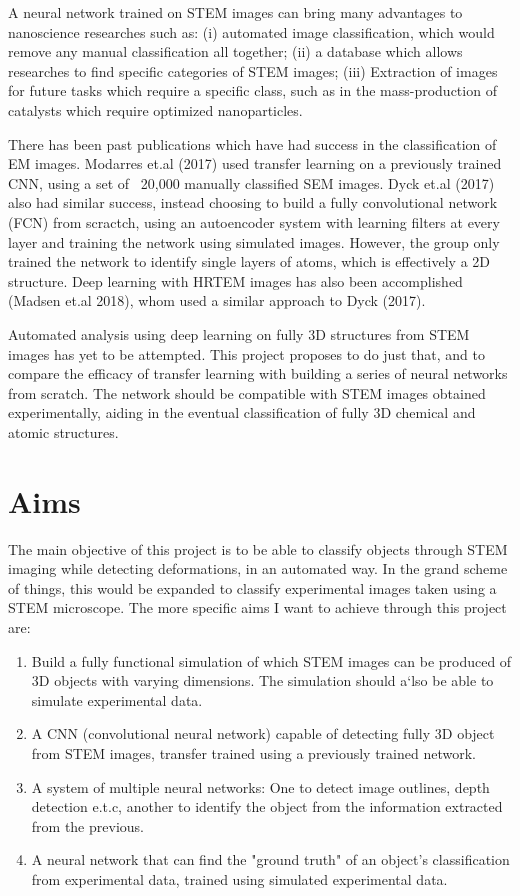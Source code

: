 \documentclass{cookedoc}
\begin{document}
	A neural network trained on STEM images can bring many advantages to nanoscience researches such as: (i) automated image classification, which would remove any manual classification all together; (ii) a database which allows researches to find specific categories of STEM images; (iii) Extraction of images for future tasks which require a specific class, such as in the mass-production of catalysts which require optimized nanoparticles. 
	
	There has been past publications which have had success in the classification of EM images. Modarres et.al (2017) used transfer learning on a previously trained 
	CNN, using a set of ~20,000 manually classified SEM images. Dyck et.al (2017) also had similar success, instead choosing to build a fully convolutional network (FCN) from scractch, using an autoencoder system with learning filters at every layer and training the network using simulated images. However, the group only trained the network to identify single layers of atoms, which is effectively a 2D structure. Deep learning with HRTEM images has also been accomplished (Madsen et.al 2018), whom used a similar approach to Dyck (2017). 
	
	Automated analysis using deep learning on fully 3D structures from STEM images has yet to be attempted. This project proposes to do just that, and to compare the efficacy of transfer learning with building a series of neural networks from scratch. The network should be compatible with STEM images obtained experimentally, aiding in the eventual classification of fully 3D chemical and atomic structures. 
	
	\section{Aims}
	
	The main objective of this project is to be able to classify objects through STEM imaging while detecting deformations, in an automated way. In the grand scheme of things, this would be expanded to classify experimental images taken using a STEM microscope. The more specific aims I want to achieve through this project are:
	
	\begin{enumerate}
		\item   Build a fully functional simulation of which STEM images can be produced of 3D objects with varying dimensions. The simulation should a`lso be able to simulate experimental data.
		\item   A CNN (convolutional neural network) capable of detecting fully 3D object from STEM images, transfer trained using a previously trained network.
		\item   A system of multiple neural networks: One to detect image outlines, depth detection e.t.c, another to identify the object from the information extracted from the previous.
		\item   A neural network that can find the "ground truth" of an object's classification from experimental data, trained using simulated experimental data. 
		
	\end{enumerate}
\end{document}
